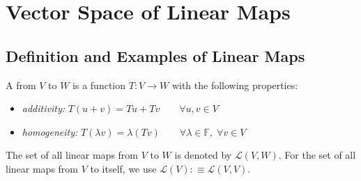 \section{Vector Space of Linear Maps}

\subsection{Definition and Examples of Linear Maps}

\begin{mydef} 
  A \lm from $V$ to $W$ is a function $T:V\to W$ with the following properties:
  \begin{itemize}
    \item \emph{additivity:} $T(u+v)=Tu + Tv \qquad \forall u,v \in V$
    \item \emph{homogeneity:} $T(\lambda v)=\lambda (Tv) \qquad
    \forall \lambda \in \mathbb{F}, \; \forall v\in V$
  \end{itemize}
\end{mydef}

\begin{mydef} 
  The set of all linear maps from $V$ to $W$ is denoted by $\mathcal{L}(V,W)$. For the set of all linear maps from $V$ to itself, we use $\mathcal{L}(V) :\equiv \mathcal{L}(V,V)$.
\end{mydef}

